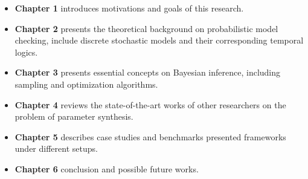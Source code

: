 \begin{itemize}
      \item \textbf{Chapter 1} introduces motivations and goals of this research.
      \item \textbf{Chapter 2} presents the theoretical background on probabilistic model checking,
            include discrete stochastic models and their  corresponding temporal logics.
      \item \textbf{Chapter 3} presents essential concepts on Bayesian inference, including sampling
            and optimization algorithms.
      \item \textbf{Chapter 4} reviews the state-of-the-art works of other researchers on the
            problem of parameter synthesis.
      \item \textbf{Chapter 5} describes case studies and benchmarks presented frameworks under
            different setups.
      \item \textbf{Chapter 6} conclusion and possible future works.
\end{itemize}


